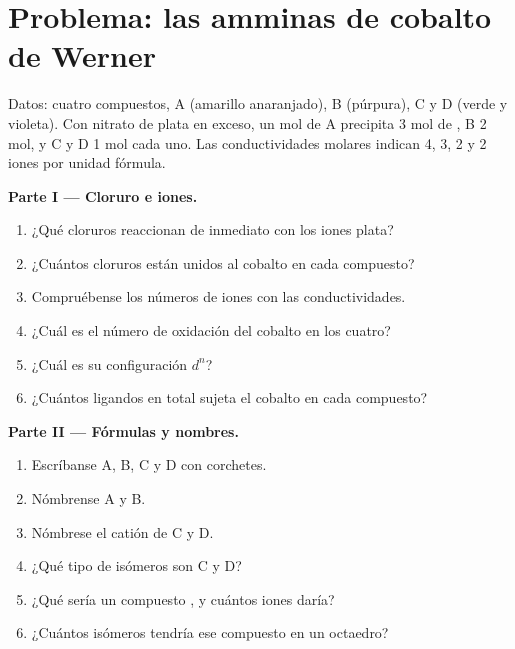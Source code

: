 \section{Problema: las amminas de cobalto de Werner}

\begin{problem}
\label{pb:b2:coordination-complexes:1}
Datos: cuatro compuestos, A  (amarillo anaranjado), B 
(púrpura), C y D  (verde y violeta). Con nitrato de plata en exceso,
un mol de A precipita 3 mol de , B 2 mol, y C y D 1 mol cada uno. Las conductividades
molares indican 4, 3, 2 y 2 iones por unidad fórmula.

\medskip
\noindent\textbf{Parte I --- Cloruro e iones.}
\begin{enumerate}
  \item ¿Qué cloruros reaccionan de inmediato con los iones plata?
  \item ¿Cuántos cloruros están unidos al cobalto en cada compuesto?
  \item Compruébense los números de iones con las conductividades.
  \item ¿Cuál es el número de oxidación del cobalto en los cuatro?
  \item ¿Cuál es su configuración $d^n$?
  \item ¿Cuántos ligandos en total sujeta el cobalto en cada compuesto?
\end{enumerate}

\medskip
\noindent\textbf{Parte II --- Fórmulas y nombres.}
\begin{enumerate}[resume]
  \item Escríbanse A, B, C y D con corchetes.
  \item Nómbrense A y B.
  \item Nómbrese el catión de C y D.
  \item ¿Qué tipo de isómeros son C y D?
  \item ¿Qué sería un compuesto , y cuántos iones daría?
  \item ¿Cuántos isómeros tendría ese compuesto en un octaedro?
\end{enumerate}


\end{problem}
